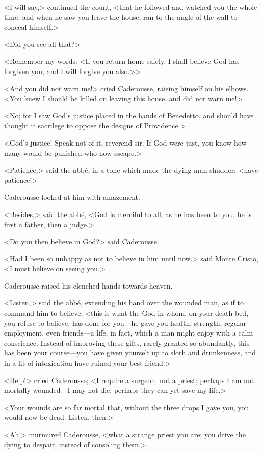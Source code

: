  <I will say,> continued the count, <that he followed and watched you the whole time, and when he saw you leave the house, ran to the angle of the wall to conceal himself.> 

 <Did you see all that?> 

 <Remember my words: <If you return home safely, I shall believe God has forgiven you, and I will forgive you also.>> 

 <And you did not warn me!> cried Caderousse, raising himself on his elbows. <You knew I should be killed on leaving this house, and did not warn me!>

<No; for I saw God's justice placed in the hands of Benedetto, and should have thought it sacrilege to oppose the designs of Providence.> 

 <God's justice! Speak not of it, reverend sir. If God were just, you know how many would be punished who now escape.> 

 <Patience,> said the abbé, in a tone which made the dying man shudder; <have patience!> 

 Caderousse looked at him with amazement. 

 <Besides,> said the abbé, <God is merciful to all, as he has been to you; he is first a father, then a judge.> 

 <Do you then believe in God?> said Caderousse. 

 <Had I been so unhappy as not to believe in him until now,> said Monte Cristo, <I must believe on seeing you.> 

 Caderousse raised his clenched hands towards heaven. 

 <Listen,> said the abbé, extending his hand over the wounded man, as if to command him to believe; <this is what the God in whom, on your death-bed, you refuse to believe, has done for you—he gave you health, strength, regular employment, even friends—a life, in fact, which a man might enjoy with a calm conscience. Instead of improving these gifts, rarely granted so abundantly, this has been your course—you have given yourself up to sloth and drunkenness, and in a fit of intoxication have ruined your best friend.> 

 <Help!> cried Caderousse; <I require a surgeon, not a priest; perhaps I am not mortally wounded—I may not die; perhaps they can yet save my life.> 

 <Your wounds are so far mortal that, without the three drops I gave you, you would now be dead. Listen, then.> 

 <Ah,> murmured Caderousse, <what a strange priest you are; you drive the dying to despair, instead of consoling them.> 

